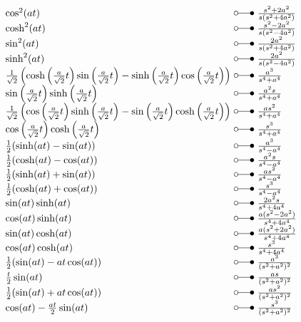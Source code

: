 \begin{footnotesize}
\[ \begin{array}{@{}l@{ ~ \laplace ~ }l@{}}
\cos^2(at) &
    \frac{s^2 + 2a^2}{s (s^2 + 4a^2)} \\
\cosh^2(at) &
    \frac{s^2 - 2a^2}{s (s^2 - 4a^2)} \\
\sin^2(at) &
    \frac{2a^2}{s (s^2 + 4a^2)} \\
\sinh^2(at) &
    \frac{2a^2}{s (s^2 - 4a^2)} \\
\frac{1}{\sqrt{2}} \left(\cosh\left(\frac{a}{\sqrt{2}}t\right) \sin\left(\frac{a}{\sqrt{2}}t\right) - \sinh\left(\frac{a}{\sqrt{2}}t\right) \cos\left(\frac{a}{\sqrt{2}}t\right)\right) &
    \frac{a^3}{s^4 + a^4} \\
\sin\left(\frac{a}{\sqrt{2}}t\right) \sinh\left(\frac{a}{\sqrt{2}}t\right) &
    \frac{a^2 s}{s^4 + a^4} \\
\frac{1}{\sqrt{2}} \left(\cos\left(\frac{a}{\sqrt{2}}t\right) \sinh\left(\frac{a}{\sqrt{2}}t\right) - \sin\left(\frac{a}{\sqrt{2}}t\right) \cosh\left(\frac{a}{\sqrt{2}}t\right)\right) &
    \frac{a s^2}{s^4 + a^4} \\
\cos\left(\frac{a}{\sqrt{2}}t\right) \cosh\left(\frac{a}{\sqrt{2}}t\right) &
    \frac{s^3}{s^4 + a^4} \\
\frac{1}{2} (\sinh(at) - \sin(at)) &
    \frac{a^3}{s^4 - a^4} \\
\frac{1}{2} (\cosh(at) - \cos(at)) &
    \frac{a^2s}{s^4 - a^4} \\
\frac{1}{2} (\sinh(at) + \sin(at)) & 
    \frac{as^2}{s^4 - a^4} \\
\frac{1}{2} (\cosh(at) + \cos(at)) &
    \frac{s^3}{s^4 - a^4} \\
\sin(at) \sinh(at) &
    \frac{2 a^2 s}{s^4 + 4 a^4} \\
\cos(at) \sinh(at) &
    \frac{a (s^2 - 2 a^2)}{s^4 + 4 a^4} \\
\sin(at) \cosh(at) &
    \frac{a (s^2 + 2 a^2)}{s^4 + 4 a^4} \\
\cos(at) \cosh(at) &
    \frac{s^3}{s^4 + 4 a^4} \\
\frac{1}{2} (\sin(at) - at \cos(at)) &
    \frac{a^3}{(s^2 + a^2)^2} \\
\frac{t}{2} \sin(at) &
    \frac{a s}{(s^2 + a^2)^2} \\
\frac{1}{2} (\sin(at) + at \cos(at)) &
    \frac{a s^2}{(s^2 + a^2)^2} \\
\cos(at) - \frac{at}{2} \sin(at) &
    \frac{s^3}{(s^2 + a^2)^2} \\
\end{array} \]


\end{footnotesize}
